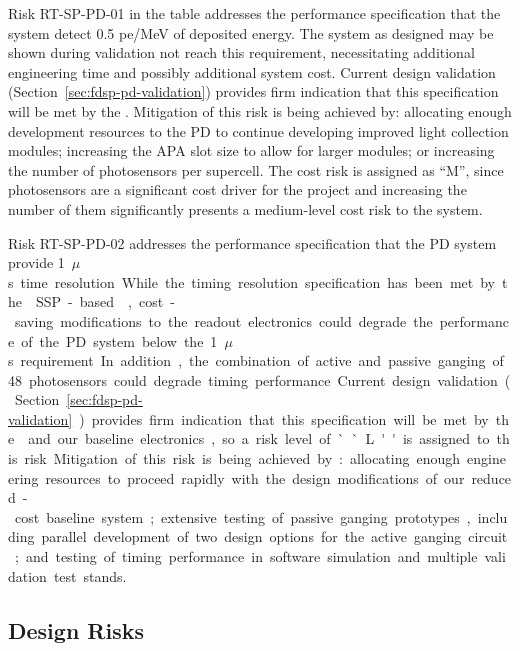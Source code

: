 Risk RT-SP-PD-01 in the table addresses the performance specification that the  system detect 0.5 pe/MeV of deposited energy.  The system as designed may be shown during validation not reach this requirement, necessitating additional engineering time and possibly additional system cost.  Current design validation (Section~\ref{sec:fdsp-pd-validation}) 
provides firm indication that this specification will be met by the .  Mitigation of this risk is being achieved by:  allocating enough development resources to the PD to continue developing improved light collection modules; increasing the APA slot size to allow for larger modules; or increasing the number of photosensors per  supercell.  The cost risk is assigned as ``M'', since photosensors are a significant cost driver for the project and increasing the number of them significantly presents a medium-level cost risk to the system.

Risk RT-SP-PD-02 addresses the performance specification that the PD system provide \SI{1}{$\mu$s} time resolution.  While the timing resolution specification has been met by the  SSP-based ,  cost-saving modifications to the readout electronics could degrade the performance of the PD system below the \SI{1}{$\mu$s} requirement.  In addition, the combination of active and passive ganging of 48 photosensors could degrade timing performance.  Current design validation (Section~\ref{sec:fdsp-pd-validation}) provides firm indication that this specification will be met by the  and our baseline electronics, so a risk level of ``L'' is assigned to this risk.  Mitigation of this risk is being achieved by:  allocating enough engineering resources to proceed rapidly with the design modifications of our reduced-cost baseline system; extensive testing of passive ganging prototypes, including parallel development of two design options for the active ganging circuit; and testing of timing performance in software simulation and multiple validation test stands.


\subsection{Design Risks}

